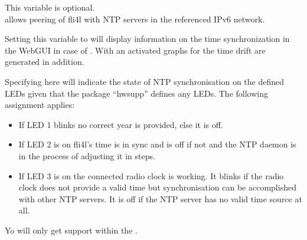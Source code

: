 \begin{description}
  This variable is optional.\\
   allows peering of fli4l with NTP servers in the referenced IPv6 network.


  Setting this variable to  will display information on the time
  synchronization in the WebGUI in case of . With an activated
   graphs for the time drift are generated in addition.


  Specifying  here will indicate the state of NTP synchronisation
  on the defined LEDs given that the package ``hwsupp'' defines any LEDs.
  The following assignment applies:
  \begin{itemize}
  \item If LED 1 blinks no correct year is provided, else it is off.
  \item If LED 2 is on fli4l's time is in sync and is off if not and the NTP
	daemon is in the process of adjusting it in steps.
  \item If LED 3 is on the connected radio clock is working. It blinks if
        the radio clock does not provide a valid time but synchronisation
        can be accomplished with other NTP servers. It is off if the NTP
        server has no valid time source at all.
  \end{itemize}

\end{description}

Yo will only get support within the .

